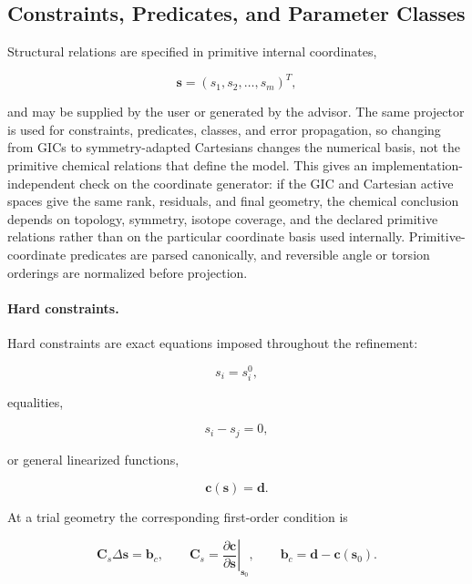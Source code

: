 \documentclass[aip,jcp,reprint,longbibliography,floatfix]{revtex4-2}
\begin{document}
\subsection{Constraints, Predicates, and Parameter Classes}

Structural relations are specified in primitive internal coordinates,

\begin{equation}
\mathbf{s} = (s_1,s_2,\ldots,s_m)^T ,
\end{equation}

and may be supplied by the user or generated by the advisor. The same
projector is used for constraints, predicates, classes, and error propagation,
so changing from GICs to symmetry-adapted Cartesians changes the numerical
basis, not the primitive chemical relations that define the model.
This gives an implementation-independent check on the coordinate generator:
if the GIC and Cartesian active spaces give the same rank, residuals, and final
geometry, the chemical conclusion depends on topology, symmetry, isotope
coverage, and the declared primitive relations rather than on the particular
coordinate basis used internally.
Primitive-coordinate predicates are parsed canonically, and reversible
angle or torsion orderings are normalized before projection.

\paragraph{Hard constraints.}

Hard constraints are exact equations imposed throughout the refinement:

\begin{equation}
s_i=s_i^{0},
\end{equation}

equalities,

\begin{equation}
s_i-s_j=0,
\end{equation}

or general linearized functions,

\begin{equation}
\mathbf{c}(\mathbf{s})=\mathbf{d}.
\end{equation}

At a trial geometry the corresponding first-order condition is

\begin{equation}
\mathbf{C}_s
\Delta\mathbf{s}
=
\mathbf{b}_c,
\qquad
\mathbf{C}_s =
\left.
\frac{\partial\mathbf{c}}
{\partial\mathbf{s}}
\right|_{\mathbf{s}_0},
\qquad
\mathbf{b}_c=\mathbf{d}-\mathbf{c}(\mathbf{s}_0).
\end{equation}
\end{document}
